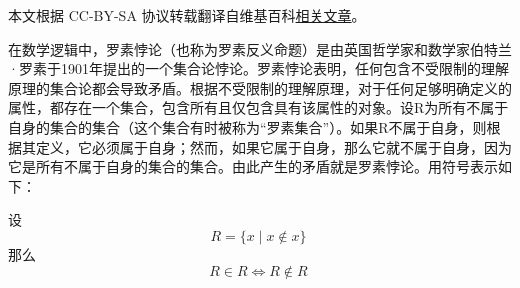 
本文根据 CC-BY-SA 协议转载翻译自维基百科\href{https://en.wikipedia.org/wiki/Russell%27s_paradox}{相关文章}。

在数学逻辑中，罗素悖论（也称为罗素反义命题）是由英国哲学家和数学家伯特兰·罗素于1901年提出的一个集合论悖论。罗素悖论表明，任何包含不受限制的理解原理的集合论都会导致矛盾。根据不受限制的理解原理，对于任何足够明确定义的属性，都存在一个集合，包含所有且仅包含具有该属性的对象。设R为所有不属于自身的集合的集合（这个集合有时被称为“罗素集合”）。如果R不属于自身，则根据其定义，它必须属于自身；然而，如果它属于自身，那么它就不属于自身，因为它是所有不属于自身的集合的集合。由此产生的矛盾就是罗素悖论。用符号表示如下：

设 
\[
R = \{ x \mid x \notin x \}~
\]
那么
\[
R \in R \iff R \notin R~
\]